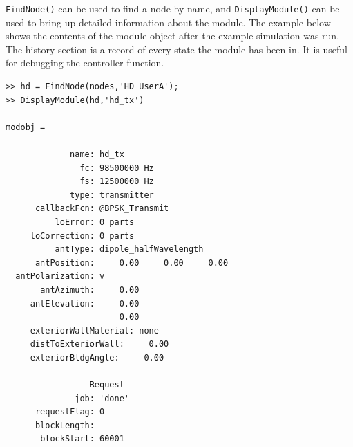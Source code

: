 \verb+FindNode()+ can be used to find a node by name, and
\verb+DisplayModule()+ can be used to bring up detailed information
about the module.  The example below shows the contents of the
module object after the example simulation was run.  The history
section is a record of every state the module has been in.  It is
useful for debugging the controller function.

\begin{lstlisting}[numbers=none]
>> hd = FindNode(nodes,'HD_UserA');
>> DisplayModule(hd,'hd_tx')

modobj =

             name: hd_tx
               fc: 98500000 Hz
               fs: 12500000 Hz
             type: transmitter
      callbackFcn: @BPSK_Transmit
          loError: 0 parts
     loCorrection: 0 parts
          antType: dipole_halfWavelength
      antPosition:     0.00     0.00     0.00
  antPolarization: v
       antAzimuth:     0.00
     antElevation:     0.00
                       0.00
     exteriorWallMaterial: none
     distToExteriorWall:     0.00
     exteriorBldgAngle:     0.00

                 Request
              job: 'done'
      requestFlag: 0
      blockLength:
       blockStart: 60001


\end{lstlisting}
